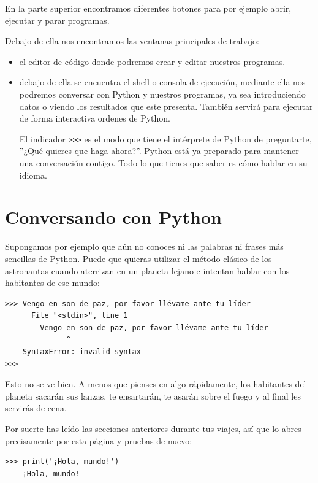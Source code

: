 En la parte superior encontramos diferentes botones para por ejemplo abrir, ejecutar y parar programas.

Debajo de ella nos encontramos las ventanas principales de trabajo: 

\begin{itemize}[nosep]
 \item  el editor de código donde podremos crear y editar nuestros programas. 
 \item debajo de ella se encuentra el shell o consola de ejecución, mediante ella nos podremos conversar con Python y nuestros programas, ya sea introduciendo datos o viendo los resultados que este presenta. También servirá para ejecutar de forma interactiva ordenes de Python.
 
 El indicador \verb|>>>| es el modo que tiene el intérprete de Python de preguntarte, ''¿Qué quieres que haga ahora?''. Python está ya preparado para mantener una
conversación contigo. Todo lo que tienes que saber es cómo hablar en su idioma.
\end{itemize}


\hypertarget{conversando-con-python}{%
\section{Conversando con Python}\label{conversando-con-python}}


Supongamos por ejemplo que aún no conoces ni las palabras ni frases más sencillas
de Python. Puede que quieras utilizar el método clásico de los
astronautas cuando aterrizan en un planeta lejano e intentan hablar con los
habitantes de ese mundo:

\begin{Verbatim}[frame=single]
>>> Vengo en son de paz, por favor llévame ante tu líder
      File "<stdin>", line 1
        Vengo en son de paz, por favor llévame ante tu líder
              ^
    SyntaxError: invalid syntax
>>>
\end{Verbatim}


Esto no se ve bien. A menos que pienses en algo rápidamente, los habitantes del planeta sacarán sus lanzas, te ensartarán, te asarán sobre el fuego y al final les servirás de cena.

Por suerte has leído las secciones anteriores durante tus viajes, así que lo abres precisamente por esta página y pruebas de nuevo:

\begin{Verbatim}[frame=single]
>>> print('¡Hola, mundo!')
    ¡Hola, mundo!
\end{Verbatim}


